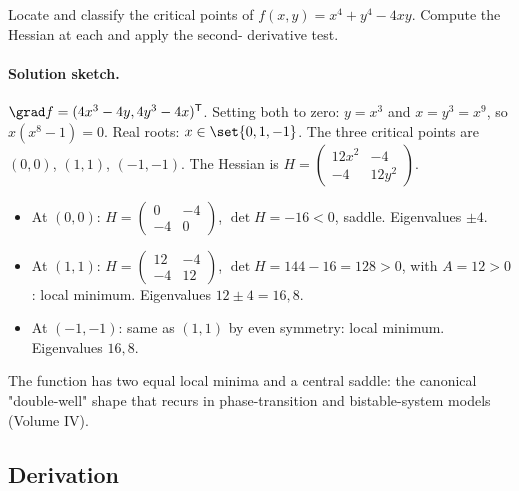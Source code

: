 \begin{exercise}
Locate and classify the critical points of $f(x, y) = x^{4} + y^{4}
- 4 x y$. Compute the Hessian at each and apply the second-
derivative test.

\paragraph{Solution sketch.} $\grad f = (4 x^{3} - 4 y, 4 y^{3} -
4 x)^{\mathsf{T}}$. Setting both to zero: $y = x^{3}$ and $x = y^{3}
= x^{9}$, so $x(x^{8} - 1) = 0$. Real roots: $x \in \set{0, 1, -1}$.
The three critical points are $(0, 0)$, $(1, 1)$, $(-1, -1)$. The
Hessian is $H = \begin{pmatrix} 12 x^{2} & -4 \\ -4 & 12 y^{2}
\end{pmatrix}$.
\begin{itemize}[leftmargin=*]
  \item At $(0, 0)$: $H = \begin{pmatrix} 0 & -4 \\ -4 & 0
    \end{pmatrix}$, $\det H = -16 < 0$, saddle. Eigenvalues
    $\pm 4$.
  \item At $(1, 1)$: $H = \begin{pmatrix} 12 & -4 \\ -4 & 12
    \end{pmatrix}$, $\det H = 144 - 16 = 128 > 0$, with $A = 12 >
    0$: local minimum. Eigenvalues $12 \pm 4 = 16, 8$.
  \item At $(-1, -1)$: same as $(1, 1)$ by even symmetry: local
    minimum. Eigenvalues $16, 8$.
\end{itemize}
The function has two equal local minima and a central saddle: the
canonical "double-well" shape that recurs in phase-transition and
bistable-system models (Volume IV).
\end{exercise}

\subsection*{Derivation}

